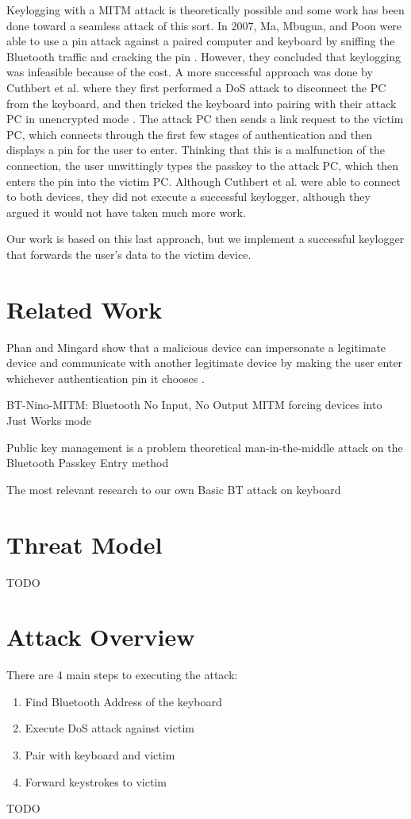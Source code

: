 \documentclass{acm_proc_article-sp}
\begin{document}
Keylogging with a MITM attack is theoretically possible and some work has been done toward a seamless attack of this sort. In 2007, Ma, Mbugua, and Poon were able to use a pin attack against a paired computer and keyboard by sniffing the Bluetooth traffic and cracking the pin \cite{ma2007keystroke}. However, they concluded that keylogging was infeasible because of the cost. A more successful approach was done by Cuthbert et al. where they first performed a DoS attack to disconnect the PC from the keyboard, and then tricked the keyboard into pairing with their attack PC in unencrypted mode \cite{cuthbertbluetooth}. The attack PC then sends a link request to the victim PC, which connects through the first few stages of authentication and then displays a pin for the user to enter. Thinking that this is a malfunction of the connection, the user unwittingly types the passkey to the attack PC, which then enters the pin into the victim PC. Although Cuthbert et al. were able to connect to both devices, they did not execute a successful keylogger, although they argued it would not have taken much more work. 

Our work is based on this last approach, but we implement a successful keylogger that forwards the user's data to the victim device.


\section{Related Work}
Phan and Mingard show that a malicious device can impersonate a legitimate device and communicate with another legitimate device by making the user enter whichever authentication pin it chooses \cite{phan2012analyzing}.

BT-Nino-MITM: Bluetooth No Input, No Output 
MITM forcing devices into Just Works mode \cite{4401672}

Public key management is a problem \cite{almonanimitmssp}
theoretical man-in-the-middle attack on the Bluetooth Passkey Entry method \cite{barnickel2012implementing}

The most relevant research to our own Basic BT attack on keyboard \cite{cuthbertbluetooth}
\section{Threat Model}
TODO

\section{Attack Overview}
There are 4 main steps to executing the attack:
\begin{enumerate}
\item Find Bluetooth Address of the keyboard
\item Execute DoS attack against victim
\item Pair with keyboard and victim
\item Forward keystrokes to victim
\end{enumerate}
TODO 
\end{document}
